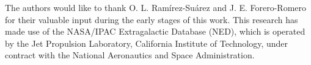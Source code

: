 \documentclass[a4paper,fleqn,usenatbib]{mnras}
\begin{document}
The authors would like to thank O. L. Ram\'irez-Su\'arez and J. E. Forero-Romero for their valuable input during the early stages of this work. This research has made use of the NASA/IPAC Extragalactic Database (NED), which is operated by the Jet Propulsion Laboratory, California Institute of Technology, under contract with the National Aeronautics and Space Administration.










\appendix
\end{document}
